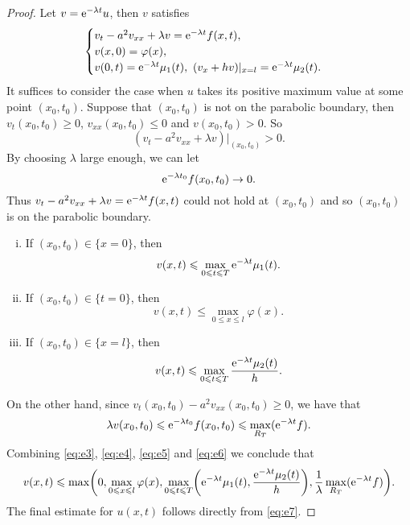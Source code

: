 \begin{proof}
  Let $v = \mathrm{e}^{-\lambda t}u$, then $v$ satisfies
  \[\begin{cases}
    v_t-a^2v_{xx}+\lambda v = \mathrm{e}^{-\lambda t}f(x,t), \\
    v(x,0) = \varphi(x), \\
    v(0,t) = \mathrm{e}^{-\lambda t}\mu_1(t),\ (v_x+hv)|_{x=l} = \mathrm{e}^{-\lambda t}\mu_2(t).
  \end{cases}\]
  It suffices to consider the case when $u$ takes its positive maximum value at some point $(x_0,t_0)$.
  Suppose that $(x_0,t_0)$ is not on the parabolic boundary, then
  $v_t(x_0,t_0)\geq 0$, $v_{xx}(x_0,t_0)\leq 0$ and $v(x_0,t_0)>0$. So
  \begin{equation}\label{eq:e1}
    (v_t - a^2v_{xx} + \lambda v)\big|_{(x_0,t_0)} > 0.
  \end{equation}
  By choosing $\lambda$ large enough, we can let
  \begin{equation}\label{eq:e2}
    \mathrm{e}^{-\lambda t_0} f(x_0,t_0) \to 0.
  \end{equation}
  Thus $v_t-a^2v_{xx}+\lambda v = \mathrm{e}^{-\lambda t}f(x,t)$ could not hold at $(x_0,t_0)$
  and so $(x_0,t_0)$ is on the parabolic boundary.
  \begin{enumerate}[(i)]
    \item If $(x_0,t_0)\in \{x=0\}$, then
      \begin{equation}\label{eq:e3}
        v(x,t) \leqslant \max_{0\leqslant t\leqslant T} \mathrm{e}^{-\lambda t} \mu_1(t).
      \end{equation}
    \item If $(x_0,t_0)\in \{t=0\}$, then
      \begin{equation}\label{eq:e4}
        v(x,t) \leq \max_{0\leq x\leq l} \varphi(x).
      \end{equation}
    \item If $(x_0,t_0)\in \{x=l\}$, then
      \begin{equation}\label{eq:e5}
        v(x,t) \leqslant \max_{0\leqslant t\leqslant T} \frac{\mathrm{e}^{-\lambda t}\mu_2(t)}{h}.
      \end{equation}
  \end{enumerate}
  On the other hand, since $v_t(x_0,t_0)-a^2v_{xx}(x_0,t_0) \geq 0$, we have that
  \begin{equation}\label{eq:e6}
    \lambda v(x_0,t_0) \leqslant \mathrm{e}^{-\lambda t_0} f(x_0,t_0) \leqslant \max_{R_T} (\mathrm{e}^{-\lambda t}f).
  \end{equation}
  Combining \eqref{eq:e3}, \eqref{eq:e4}, \eqref{eq:e5} and \eqref{eq:e6} we conclude that
  \begin{equation}\label{eq:e7}
    v(x,t) \leqslant \max\biggl(0, \max_{0\leqslant x\leqslant l} \varphi(x),
      \max_{0\leqslant t\leqslant T} \biggl(\mathrm{e}^{-\lambda t}\mu_1(t), \frac{\mathrm{e}^{-\lambda t}\mu_2(t)}{h}\biggr),
      \frac{1}{\lambda} \max_{R_T} (\mathrm{e}^{-\lambda t}f)\biggr).
  \end{equation}
  The final estimate for $u(x,t)$ follows directly from \eqref{eq:e7}.
\end{proof}


